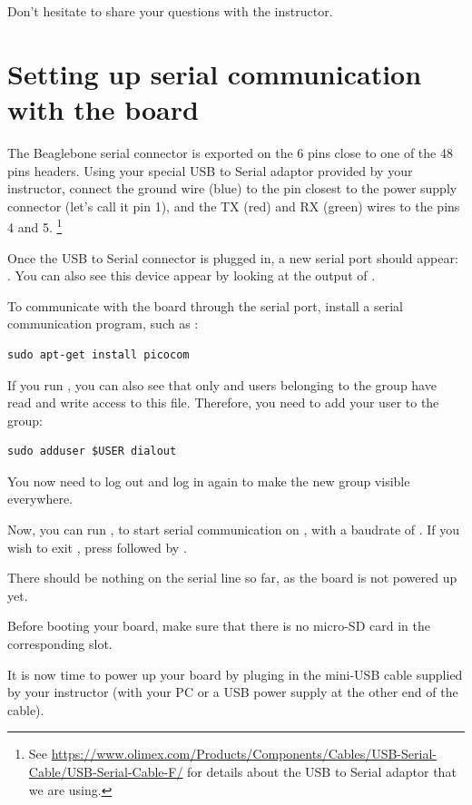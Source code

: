 Don't hesitate to share your questions with the instructor.

\section{Setting up serial communication with the board}

The Beaglebone serial connector is exported on the 6 pins close to one
of the 48 pins headers. Using your special USB to Serial adaptor provided
by your instructor, connect the ground wire (blue) to the pin closest
to the power supply connector (let's call it pin 1), and the TX (red)
and RX (green) wires to the pins 4 and 5.
\footnote{See
\url{https://www.olimex.com/Products/Components/Cables/USB-Serial-Cable/USB-Serial-Cable-F/}
for details about the USB to Serial adaptor that we are using.} 

Once the USB to Serial connector is plugged in, a new serial port
should appear: .  You can also see this device
appear by looking at the output of .

To communicate with the board through the serial port, install a
serial communication program, such as :

\begin{verbatim}
sudo apt-get install picocom
\end{verbatim}

If you run , you can also see that only
 and users belonging to the  group have
read and write access to this file. Therefore, you need to add your user
to the  group:

\begin{verbatim}
sudo adduser $USER dialout
\end{verbatim}

You now need to log out and log in again to make the new group
visible everywhere.

Now, you can run , to start serial
communication on , with a baudrate of . If
you wish to exit , press \code{[Ctrl][a]} followed by
\code{[Ctrl][x]}.

There should be nothing on the serial line so far, as the board is not
powered up yet.

Before booting your board, make sure that there is no micro-SD card
in the corresponding slot.

It is now time to power up your board by pluging in the mini-USB
cable supplied by your instructor (with your PC or a USB power supply at the
other end of the cable).

